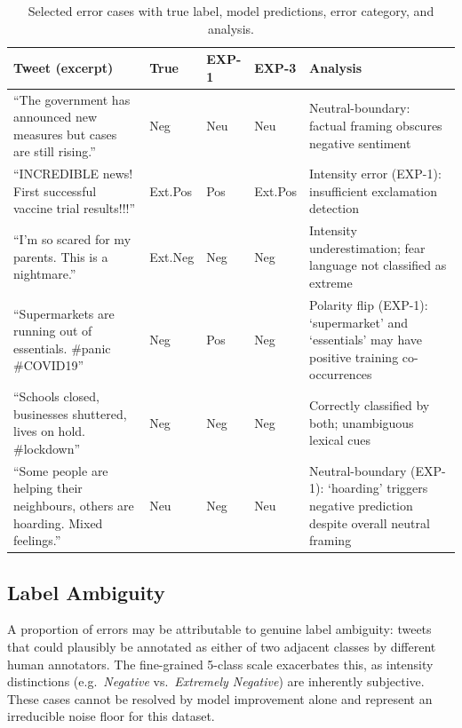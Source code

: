\begin{table}[H]
    \centering
    \caption{Selected error cases with true label, model predictions, error category, and analysis.}
    \label{tab:failure_cases}
    \begin{tabularx}{\textwidth}{X l l l X}
        \toprule
        \textbf{Tweet (excerpt)} & \textbf{True} & \textbf{EXP-1} & \textbf{EXP-3} & \textbf{Analysis} \\
        \midrule
        ``The government has announced new measures but cases are still rising.''
            & Neg & Neu & Neu & Neutral-boundary: factual framing obscures negative sentiment \\
        \addlinespace
        ``INCREDIBLE news! First successful vaccine trial results!!!''
            & Ext.Pos & Pos & Ext.Pos & Intensity error (EXP-1): insufficient exclamation detection \\
        \addlinespace
        ``I'm so scared for my parents. This is a nightmare.''
            & Ext.Neg & Neg & Neg & Intensity underestimation; fear language not classified as extreme \\
        \addlinespace
        ``Supermarkets are running out of essentials. \#panic \#COVID19''
            & Neg & Pos & Neg & Polarity flip (EXP-1): `supermarket' and `essentials' may have positive training co-occurrences \\
        \addlinespace
        ``Schools closed, businesses shuttered, lives on hold. \#lockdown''
            & Neg & Neg & Neg & Correctly classified by both; unambiguous lexical cues \\
        \addlinespace
        ``Some people are helping their neighbours, others are hoarding. Mixed feelings.''
            & Neu & Neg & Neu & Neutral-boundary (EXP-1): `hoarding' triggers negative prediction despite overall neutral framing \\
        \bottomrule
    \end{tabularx}
\end{table}

\subsection{Label Ambiguity}

A proportion of errors may be attributable to genuine label ambiguity: tweets that could plausibly be annotated as either of two adjacent classes by different human annotators. The fine-grained 5-class scale exacerbates this, as intensity distinctions (e.g.\ \textit{Negative} vs.\ \textit{Extremely Negative}) are inherently subjective. These cases cannot be resolved by model improvement alone and represent an irreducible noise floor for this dataset.
